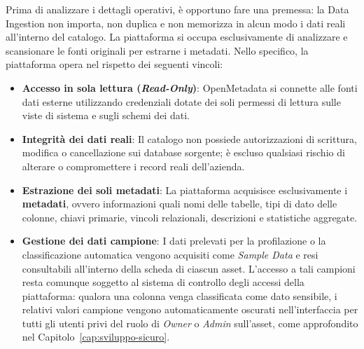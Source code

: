 Prima di analizzare i dettagli operativi, è opportuno fare una premessa: la Data Ingestion non importa, non duplica e non 
memorizza in alcun modo i dati reali all'interno del catalogo. La piattaforma si occupa esclusivamente di analizzare e scansionare le fonti originali per estrarne i metadati. 
Nello specifico, la piattaforma opera nel rispetto dei seguenti vincoli:
\begin{itemize}
    \item \textbf{Accesso in sola lettura (\emph{Read-Only})}: OpenMetadata si connette alle fonti dati esterne utilizzando credenziali dotate dei soli permessi di lettura sulle viste di sistema e sugli schemi dei dati.
    \item \textbf{Integrità dei dati reali}: Il catalogo non possiede autorizzazioni di scrittura, modifica o cancellazione sui database sorgente; è escluso qualsiasi rischio di alterare o compromettere i record reali dell'azienda.
    \item \textbf{Estrazione dei soli metadati}: La piattaforma acquisisce esclusivamente i \textbf{metadati}, ovvero informazioni quali nomi delle tabelle, tipi di dato delle colonne, chiavi primarie, vincoli relazionali, descrizioni e statistiche aggregate.
    \item \textbf{Gestione dei dati campione}: I dati prelevati per la profilazione o la classificazione automatica vengono acquisiti come \emph{Sample Data} e resi consultabili all'interno della scheda di ciascun asset. L'accesso a tali campioni resta comunque soggetto al sistema di controllo degli accessi della piattaforma: qualora una colonna venga classificata come dato sensibile, i relativi valori campione vengono automaticamente oscurati nell'interfaccia per tutti gli utenti privi del ruolo di \emph{Owner} o \emph{Admin} sull'asset, come approfondito nel Capitolo~\ref{cap:sviluppo-sicuro}.
\end{itemize}

